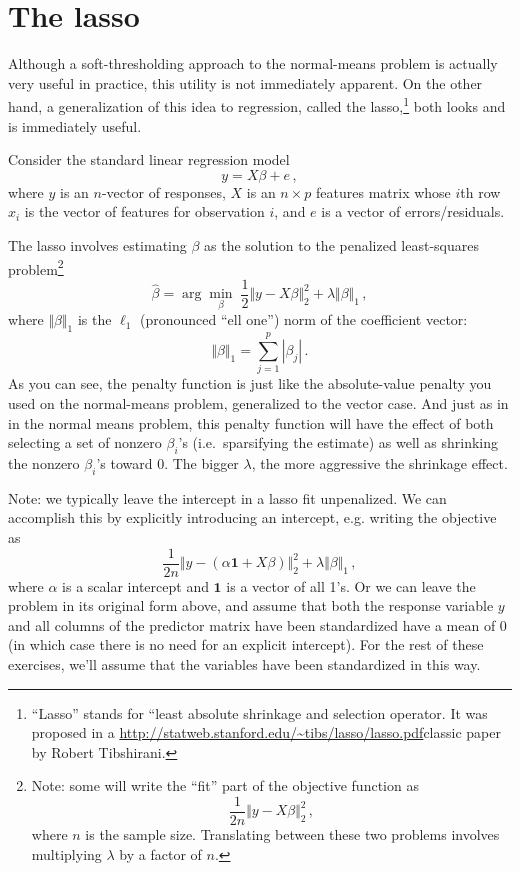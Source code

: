 \documentclass[11 pt]{article}
\begin{document}
\newpage
\section{The lasso}

Although  a soft-thresholding approach to the normal-means problem is actually very useful in practice, this utility is not immediately apparent.  On the other hand, a generalization of this idea to regression, called the lasso,\footnote{``Lasso'' stands for ``least absolute shrinkage and selection operator.  It was proposed in a \url{http://statweb.stanford.edu/~tibs/lasso/lasso.pdf}{classic paper} by Robert Tibshirani.} both looks and is immediately useful.

Consider the standard linear regression model
$$
y = X \beta + e \, ,
$$
where $y$ is an $n$-vector of responses, $X$ is an $n \times p$ features matrix whose $i$th row $x_i$ is the vector of features for observation $i$, and $e$ is a vector of errors/residuals.

The lasso involves estimating $\beta$ as the solution to the penalized least-squares problem\footnote{Note: some will write the ``fit'' part of the objective function as
$$
\frac{1}{2n} \Vert y - X \beta \Vert_2^2 \, ,
$$
where $n$ is the sample size.  Translating between these two problems involves multiplying $\lambda$ by a factor of $n$.
}
$$
\hat{\beta} = \arg \min_{\beta} \; \frac{1}{2} \Vert y - X \beta \Vert_2^2 + \lambda \Vert \beta \Vert_1 \, ,
$$
where $\Vert \beta \Vert_1$ is the $\ell_1$ (pronounced ``ell one'') norm of the coefficient vector:
$$
\Vert \beta \Vert_1 = \sum_{j=1}^p |\beta_j| \, .
$$
As you can see, the penalty function is just like the absolute-value penalty you used on the normal-means problem, generalized to the vector case.  And just as in in the normal means problem, this penalty function will have the effect of both selecting a set of nonzero $\beta_i$'s (i.e.~sparsifying the estimate) as well as shrinking the nonzero $\beta_i$'s toward 0.  The bigger $\lambda$, the more aggressive the shrinkage effect.

Note: we typically leave the intercept in a lasso fit unpenalized.  We can accomplish this by explicitly introducing an intercept, e.g. writing the objective as
$$
\frac{1}{2n} \Vert y - (\alpha \mathbf{1} + X \beta) \Vert_2^2 + \lambda \Vert \beta \Vert_1 \, ,
$$
where $\alpha$ is a scalar intercept and $\mathbf{1}$ is a vector of all 1's.  Or we can leave the problem in its original form above, and assume that both the response variable $y$ and all columns of the predictor matrix have been standardized have a mean of 0 (in which case there is no need for an explicit intercept).  For the rest of these exercises, we'll assume that the variables have been standardized in this way.
\end{document}
